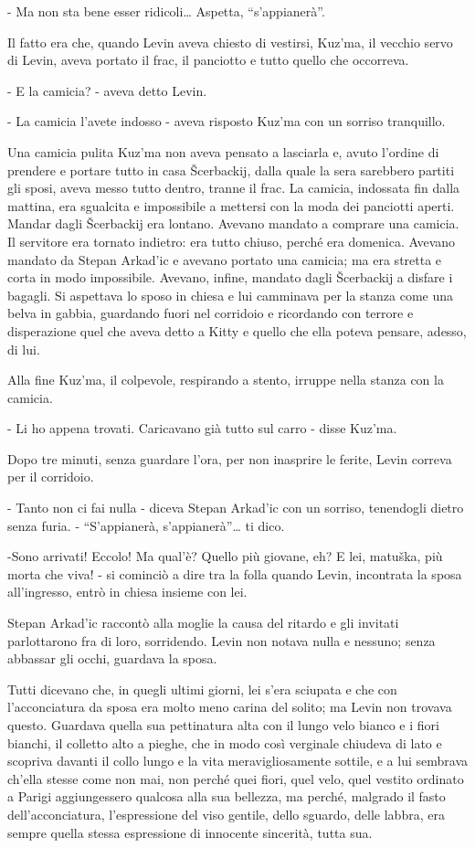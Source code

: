- Ma non sta bene esser ridicoli\ldots{} Aspetta, ``s'appianerà''. 

Il fatto era che, quando Levin aveva chiesto di vestirsi, Kuz'ma, il vecchio servo di Levin, aveva portato il frac, il panciotto e tutto quello che occorreva. 

- E la camicia? - aveva detto Levin. 

- La camicia l'avete indosso - aveva risposto Kuz'ma con un sorriso tranquillo. 

Una camicia pulita Kuz'ma non aveva pensato a lasciarla e, avuto l'ordine di prendere e portare tutto in casa Šcerbackij, dalla quale la sera sarebbero partiti gli sposi, aveva messo tutto dentro, tranne il frac. La camicia, indossata fin dalla mattina, era sgualcita e impossibile a mettersi con la moda dei panciotti aperti. Mandar dagli Šcerbackij era lontano. Avevano mandato a comprare una camicia. Il servitore era tornato indietro: era tutto chiuso, perché era domenica. Avevano mandato da Stepan Arkad'ic e avevano portato una camicia; ma era stretta e corta in modo impossibile. Avevano, infine, mandato dagli Šcerbackij a disfare i bagagli. Si aspettava lo sposo in chiesa e lui camminava per la stanza come una belva in gabbia, guardando fuori nel corridoio e ricordando con terrore e disperazione quel che aveva detto a Kitty e quello che ella poteva pensare, adesso, di lui. 

Alla fine Kuz'ma, il colpevole, respirando a stento, irruppe nella stanza con la camicia. 

- Li ho appena trovati. Caricavano già tutto sul carro - disse Kuz'ma. 

Dopo tre minuti, senza guardare l'ora, per non inasprire le ferite, Levin correva per il corridoio. 

- Tanto non ci fai nulla - diceva Stepan Arkad'ic con un sorriso, tenendogli dietro senza furia. - ``S'appianerà, s'appianerà''\ldots{} ti dico. 

-Sono arrivati! Eccolo! Ma qual'è? Quello più giovane, eh? E lei, matuška, più morta che viva! - si cominciò a dire tra la folla quando Levin, incontrata la sposa all'ingresso, entrò in chiesa insieme con lei. 

Stepan Arkad'ic raccontò alla moglie la causa del ritardo e gli invitati parlottarono fra di loro, sorridendo. Levin non notava nulla e nessuno; senza abbassar gli occhi, guardava la sposa. 

Tutti dicevano che, in quegli ultimi giorni, lei s'era sciupata e che con l'acconciatura da sposa era molto meno carina del solito; ma Levin non trovava questo. Guardava quella sua pettinatura alta con il lungo velo bianco e i fiori bianchi, il colletto alto a pieghe, che in modo così verginale chiudeva di lato e scopriva davanti il collo lungo e la vita meravigliosamente sottile, e a lui sembrava ch'ella stesse come non mai, non perché quei fiori, quel velo, quel vestito ordinato a Parigi aggiungessero qualcosa alla sua bellezza, ma perché, malgrado il fasto dell'acconciatura, l'espressione del viso gentile, dello sguardo, delle labbra, era sempre quella stessa espressione di innocente sincerità, tutta sua. 

